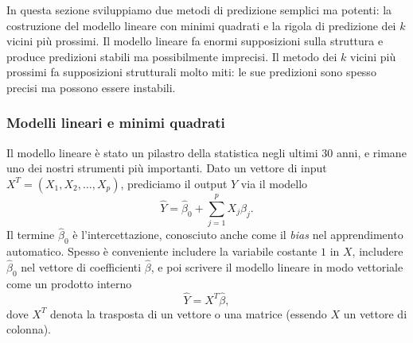 \documentclass[11pt,openany]{book}
\begin{document}
In questa sezione sviluppiamo due metodi di predizione semplici ma potenti: la costruzione del modello lineare con minimi quadrati e la rigola di predizione dei $k$ vicini più prossimi. Il modello lineare fa enormi supposizioni sulla struttura e produce predizioni stabili ma possibilmente imprecisi. Il metodo dei $k$ vicini più prossimi fa supposizioni strutturali molto miti: le sue predizioni sono spesso precisi ma possono essere instabili.

\subsubsection{Modelli lineari e minimi quadrati}

Il modello lineare è stato un pilastro della statistica negli ultimi 30 anni, e rimane uno dei nostri strumenti più importanti. Dato un vettore di input $X^T = (X_1, X_2, \dots, X_p)$, prediciamo il output $Y$ via il modello
\begin{equation}
\label{eq2-1}
\hat{Y} = \hat{\beta}_0 + \sum_{j = 1}^{p}{X_j \hat{\beta}_j}.
\end{equation}
Il termine $\hat{\beta}_0$ è l'intercettazione, conosciuto anche come il {\it bias} nel apprendimento automatico. Spesso è conveniente includere la variabile costante $1$ in $X$, includere $\hat{\beta}_0$ nel vettore di coefficienti $\hat{\beta}$, e poi scrivere il modello lineare in modo vettoriale come un prodotto interno
\begin{equation}
\label{eq2-2}
\hat{Y} = X^T \hat{\beta},
\end{equation}
dove $X^T$ denota la trasposta di un vettore o una matrice (essendo $X$ un vettore di colonna).
\end{document}
